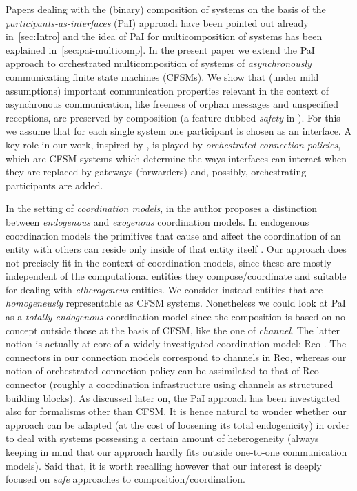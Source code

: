 Papers dealing with the (binary) composition of systems on the basis of the
{\em participants-as-interfaces\/} (PaI) approach have been pointed out already in~\cref{sec:Intro} and the idea of PaI for multicomposition of systems has been explained in~\cref{sec:pai-multicomp}.
In the present paper we  extend  the PaI approach to orchestrated multicomposition
 of systems of \emph{asynchronously} communicating finite state machines (CFSMs).
We show that  (under mild assumptions) important 
communication properties relevant  in the context of asynchronous communication, like freeness of orphan messages and unspecified receptions,  are preserved by composition (a feature dubbed 
{\em safety\/} in \cite{BDGY23}).
 For this we assume that 
for each single system one participant is chosen as an interface. 
A key role in our work, inspired by  \cite{BDGY23}, is played by
{\em orchestrated connection policies}, which are CFSM systems which determine the ways %
 interfaces can interact when they are replaced by gateways (forwarders) and, possibly, orchestrating participants are added. %
 
 \bfr
In the setting of {\em coordination models}, in \cite{Arbab98} the author proposes 
a distinction between {\em endogenous} and {\em exogenous} coordination models.
In endogenous coordination models the primitives that cause and affect the coordination of an
entity with others can reside only inside of that entity itself \cite{Arbab04}.
Our approach does not precisely fit in the context of coordination models,
since these are mostly independent of the computational entities they compose/coordinate
and suitable for dealing with {\em etherogeneus} entities.
We consider instead entities that are {\em homogeneusly} representable as CFSM systems.
Nonetheless we could look at PaI as a {\em totally endogenous} coordination model since
the composition is based on no concept outside those at the basis of CFSM,
like the one of {\em channel}. The latter notion is actually at core of a widely investigated
coordination model: Reo \cite{Arbab04}. 
The connectors in our connection models correspond to channels in Reo, whereas 
our notion of orchestrated connection policy can be assimilated to that of
Reo connector (roughly a coordination infrastructure using channels as structured building blocks).
As discussed later on, the PaI approach has been investigated also for formalisms other than CFSM.
It is hence natural to wonder whether our approach can be adapted 
(at the cost of loosening its total endogenicity) in order to deal with systems possessing
a certain amount of heterogeneity (always keeping in mind that our approach hardly fits outside
one-to-one communication models).
Said that, it is worth recalling however that our interest is deeply focused on
{\em safe} approaches to composition/coordination. 
\efr


